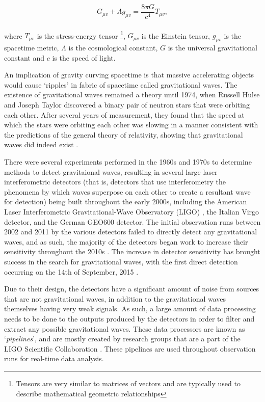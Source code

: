 \documentclass{article}
\begin{document}
\begin{equation}
    G_{\mu{}v} + \Lambda{}g_{\mu{}v} = \dfrac{8\pi{}G}{c^4}T_{\mu{}v},
\end{equation}
\\
where \(T_{\mu{}v}\) is the stress-energy tensor \footnote{Tensors are very similar to matrices of
vectors and are typically used to describe mathematical geometric relationships}, \(G_{\mu{}v}\) is
the Einstein tensor, \(g_{\mu{}v}\) is the spacetime metric, \(\Lambda\) is the cosmological
constant, \(G\) is the universal gravitational constant and \(c\) is the speed of light.

An implication of gravity curving spacetime is that massive accelerating objects would cause
`ripples' in fabric of spacetime called gravitational waves. The existence of gravitational waves
remained a theory until 1974, when Russell Hulse and Joseph Taylor discovered a binary pair of
neutron stars that were orbiting each other. After several years of measurement, they found that
the speed at which the stars were orbiting each other was slowing in a manner consistent with the
predictions of the general theory of relativity, showing that gravitational waves did indeed exist
\cite{GravDiscovery}.

There were several experiments performed in the 1960s and 1970s to determine methods to detect
gravitaional waves, resulting in several large laser interferometric detectors (that is, detectors
that use interferometry \textendash{} the phenomena by which waves superpose on each other to create
a resultant wave \textendash{} for detection) being built throughout the early 2000s, including the
American Laser Interferometric Gravitational-Wave Observatory (LIGO) \cite{LIGO}, the Italian Virgo
\cite{virgo} detector, and the German GEO600 detector. The initial observation runs between 2002 and
2011 by the various detectors failed to directly detect any gravitational waves, and as such, the
majority of the detectors began work to increase their sensitivity throughout the 2010s
\cite{aligo}.  The increase in detector sensitivity has brought success in the search for
gravitational waves, with the first direct detection occurring on the 14th of September, 2015
\cite{FirstDetectionPaper}\cite{DetectionWeb}.

Due to their design, the detectors have a significant amount of noise from sources that are not
gravitational waves, in addition to the gravitational waves themselves having very weak signals. As
such, a large amount of data processing needs to be done to the outputs produced by the detectors
in order to filter and extract any possible gravitational waves. These data processors are known as
`\textit{pipelines}', and are mostly created by research groups that are a part of the LIGO
Scientific Collaboration \cite{LSC}. These pipelines are used throughout observation runs for
real-time data analysis.
\end{document}

